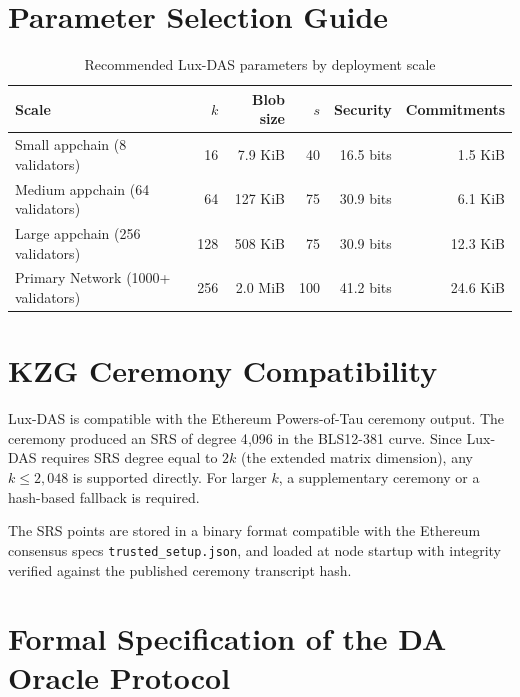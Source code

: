\documentclass[11pt,a4paper]{article}
\theoremstyle{plain}
\theoremstyle{definition}
\theoremstyle{remark}
\begin{document}
\newpage
\appendix

\section{Parameter Selection Guide}
\label{app:parameters}

\begin{table}[H]
\centering
\caption{Recommended Lux-DAS parameters by deployment scale}
\label{tab:params}
\begin{tabular}{lrrrrr}
\toprule
\textbf{Scale} & \textbf{$k$} & \textbf{Blob size} & \textbf{$s$} & \textbf{Security} & \textbf{Commitments} \\
\midrule
Small appchain (8 validators) & 16 & 7.9 KiB & 40 & 16.5 bits & 1.5 KiB \\
Medium appchain (64 validators) & 64 & 127 KiB & 75 & 30.9 bits & 6.1 KiB \\
Large appchain (256 validators) & 128 & 508 KiB & 75 & 30.9 bits & 12.3 KiB \\
Primary Network (1000+ validators) & 256 & 2.0 MiB & 100 & 41.2 bits & 24.6 KiB \\
\bottomrule
\end{tabular}
\end{table}

\section{KZG Ceremony Compatibility}
\label{app:ceremony}

Lux-DAS is compatible with the Ethereum Powers-of-Tau ceremony output. The ceremony
produced an SRS of degree 4{,}096 in the BLS12-381 curve. Since Lux-DAS requires SRS
degree equal to $2k$ (the extended matrix dimension), any $k \leq 2{,}048$ is supported
directly. For larger $k$, a supplementary ceremony or a hash-based fallback is required.

The SRS points are stored in a binary format compatible with the Ethereum consensus specs
\texttt{trusted\_setup.json}, and loaded at node startup with integrity verified against the
published ceremony transcript hash.

\section{Formal Specification of the DA Oracle Protocol}
\label{app:oracle}
\end{document}
